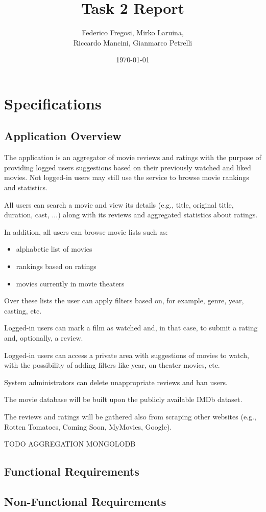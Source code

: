 \documentclass[10pt]{article}
\title{Task 2 Report}
\date{\today}
\author{Federico Fregosi, Mirko Laruina,\\
        Riccardo Mancini, Gianmarco Petrelli}
\begin{document}
\maketitle
\vfill
\tableofcontents
\vfill
\clearpage
\setcounter{page}{1}

\section{Specifications}

\subsection{Application Overview}
The application is an aggregator of movie reviews and ratings with the purpose 
of providing logged users suggestions based on their previously watched and 
liked movies. Not logged-in users may still use the service to browse movie 
rankings and statistics.

All users can search a movie and view its details (e.g., title, 
original title, duration, cast, ...) along with its reviews and aggregated 
statistics about ratings. 

In addition, all users can browse movie lists such as:
\begin{itemize}
    \item alphabetic list of movies
    \item rankings based on ratings
    \item movies currently in movie theaters
\end{itemize} 

Over these lists the user can apply filters based on, for example, genre, 
year, casting, etc.

Logged-in users can mark a film as watched and, in that case, to
submit a rating and, optionally, a review. 

Logged-in users can access a private area with suggestions of 
movies to watch, with the possibility of adding filters like year, on theater 
movies, etc.

System administrators can delete unappropriate reviews and ban users.

The movie database will be built upon the publicly available IMDb dataset.

The reviews and ratings will be gathered also from scraping other websites 
(e.g., Rotten Tomatoes, Coming Soon, MyMovies, Google).

TODO AGGREGATION MONGOLODB

\subsection{Functional Requirements}

\subsection{Non-Functional Requirements}

\end{document}
